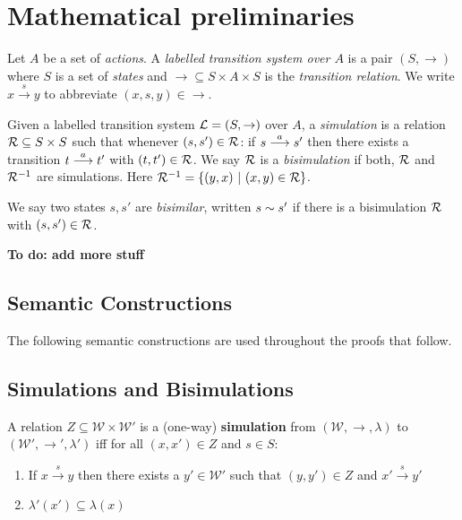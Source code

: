 \section{Mathematical preliminaries}\label{preliminaries}

\begin{definition}
Let $A$ be a set of \emph{actions}.  A \emph{labelled transition
  system over $A$} is a pair $(S, \rightarrow)$ where $S$ is a set of
\emph{states} and $\rightarrow \subseteq S \times A \times S$ is the
\emph{transition relation}.  We write $x \xrightarrow{s} y$ to
abbreviate $(x,s,y) \in \rightarrow$.
\end{definition}

\begin{definition}
Given a labelled transition system $\mathcal{L} = (S, \rightarrow)$ over $A$,
a \emph{simulation} is a relation $\mathcal{R} \subseteq S \times S$ such
that whenever $(s, s') \in \mathcal{R}$: if $s \stackrel{a}{\longrightarrow} s'$ then there
exists a transition $t \stackrel{a}{\longrightarrow} t'$ with $(t, t') \in \mathcal{R}$.  We say
$\mathcal{R}$ is a \emph{bisimulation} if both, $\mathcal{R}$ and $\mathcal{R}^{-1}$ are
simulations. Here $\mathcal{R}^{-1} = \{(y, x)\ |\ (x, y) \in \mathcal{R}\}$.

We say two states $s, s'$ are \emph{bisimilar}, written $s \sim s'$
if there is a bisimulation $\mathcal{R}$ with $(s, s') \in \mathcal{R}$.
\end{definition}


\NI \textbf{To do: add more stuff}

\subsection{Semantic Constructions}
The following semantic constructions are used throughout the proofs that follow.
\subsection{Simulations and Bisimulations}

\NI A relation $Z \subseteq \mathcal{W} \times \mathcal{W}'$ is a
(one-way) {\bf simulation} from $(\mathcal{W}, \rightarrow, \lambda)$
to $(\mathcal{W}', \rightarrow', \lambda')$ iff for all $(x,x') \in Z$
and $s \in S$:

\begin{enumerate}

\item If $x \xrightarrow{s} y$ then there exists a $y' \in
  \mathcal{W}'$ such that $(y,y') \in Z$ and $x' \xrightarrow{s} y'$

\item $\lambda'(x') \subseteq \lambda(x)$

\end{enumerate}

